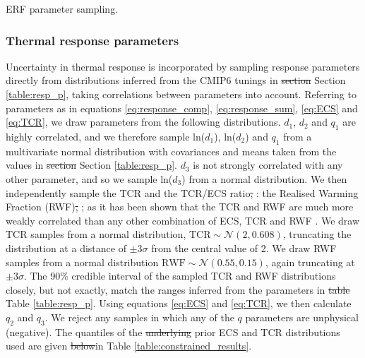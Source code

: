 \documentclass[gmd, manuscript]{copernicus}
\providecommand{\DIFadd}[1]{{\protect\color{blue}#1}} %
\providecommand{\DIFdel}[1]{{\protect\color{red}\sout{#1}}}                      %
\providecommand{\DIFaddbegin}{} %
\providecommand{\DIFaddend}{} %
\providecommand{\DIFdelbegin}{} %
\providecommand{\DIFdelend}{} %
\providecommand{\DIFaddFL}[1]{\DIFadd{#1}} %
\begin{document}
\DIFdelend \DIFaddbegin \begin{table}[h]
    \caption{\DIFaddFL{ERF parameter sampling.}}
    \label{table:erf_sampling}
    
\end{table}
\clearpage
\DIFaddend \subsubsection{Thermal response parameters} \label{response_sampling}
Uncertainty in thermal response is incorporated by sampling response parameters directly from distributions inferred from the CMIP6 tunings in \DIFdelbegin \DIFdel{section }\DIFdelend \DIFaddbegin \DIFadd{Section }\DIFaddend \ref{table:resp_p}, taking correlations between parameters into account. Referring to parameters as in equations \ref{eq:response_comp}, \ref{eq:response_sum}, \ref{eq:ECS} and \ref{eq:TCR}, we draw parameters from the following distributions. $d_1$, $d_2$ and $q_1$ are highly correlated, and we therefore sample ln($d_1$), ln($d_2$) and $q_1$ from a multivariate normal distribution with covariances and means taken from the values in \DIFdelbegin \DIFdel{section }\DIFdelend \DIFaddbegin \DIFadd{Section }\DIFaddend \ref{table:resp_p}. $d_3$ is not strongly correlated with any other parameter, and so we sample ln($d_3$) from a normal distribution. We then independently sample the TCR and the TCR/ECS ratio\DIFdelbegin \DIFdel{, }\DIFdelend \DIFaddbegin \DIFadd{: }\DIFaddend the Realised Warming Fraction (RWF)\DIFdelbegin \DIFdel{, }\DIFdelend \DIFaddbegin \DIFadd{; }\DIFaddend as it has been shown that the TCR and RWF are much more weakly correlated than any other combination of ECS, TCR and RWF \citep{Millar2015}. We draw TCR samples from a normal distribution, $\mathrm{TCR}\sim\mathcal{N}\left(2,0.608\right)$, truncating the distribution at a distance of $\pm3\sigma$ from the central value of 2. We draw RWF samples from a normal distribution $\mathrm{RWF}\sim\mathcal{N}\left(0.55,0.15\right)$, again truncating at $\pm3\sigma$. The 90\% credible interval of the sampled TCR and RWF distributions closely, but not exactly, match the ranges inferred from the parameters in \DIFdelbegin \DIFdel{table }\DIFdelend \DIFaddbegin \DIFadd{Table }\DIFaddend \ref{table:resp_p}. Using equations \ref{eq:ECS} and \ref{eq:TCR}, we then calculate $q_2$ and $q_3$. We reject any samples in which any of the $q$ parameters are unphysical (negative). The quantiles of the \DIFdelbegin \DIFdel{underlying }\DIFdelend \DIFaddbegin \DIFadd{prior }\DIFaddend ECS and TCR distributions used are given \DIFdelbegin \DIFdel{below}\DIFdelend \DIFaddbegin \DIFadd{in Table \ref{table:constrained_results}}\DIFaddend .
\end{document}
